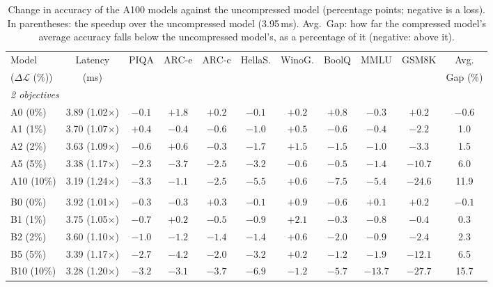 \documentclass[11pt]{article}
\newcommand{\dloss}{\Delta\mathcal{L}}
\begin{document}
\begin{table}[!ht]
\centering
\small
\setlength{\tabcolsep}{3pt}
\begin{tabular}{lcccccccccc}
\toprule
Model & Latency & PIQA & ARC-e & ARC-c & HellaS. & WinoG. & BoolQ & MMLU & GSM8K & Avg. \\
($\dloss$ (\%)) & (ms)   &      &       &       &         &        &       &      &       & Gap (\%) \\
\midrule
\multicolumn{11}{l}{\emph{2 objectives}} \\
A0  (0\%)  & 3.89 (1.02$\times$) & $-0.1$ & $+1.8$ & $+0.2$ & $-0.1$ & $+0.2$ & $+0.8$ & $-0.3$ & $+0.2$  & $-0.6$ \\
A1  (1\%)  & 3.70 (1.07$\times$) & $+0.4$ & $-0.4$ & $-0.6$ & $-1.0$ & $+0.5$ & $-0.6$ & $-0.4$ & $-2.2$  & 1.0 \\
A2  (2\%)  & 3.63 (1.09$\times$) & $-0.6$ & $+0.6$ & $-0.3$ & $-1.7$ & $+1.5$ & $-1.5$ & $-1.0$ & $-3.3$  & 1.5 \\
A5  (5\%)  & 3.38 (1.17$\times$) & $-2.3$ & $-3.7$ & $-2.5$ & $-3.2$ & $-0.6$ & $-0.5$ & $-1.4$ & $-10.7$ & 6.0 \\
A10 (10\%) & 3.19 (1.24$\times$) & $-3.3$ & $-1.1$ & $-2.5$ & $-5.5$ & $+0.6$ & $-7.5$ & $-5.4$ & $-24.6$ & 11.9 \\
\addlinespace
\multicolumn{11}{l}{\emph{3 objectives}} \\
B0  (0\%)  & 3.92 (1.01$\times$) & $-0.3$ & $-0.3$ & $+0.3$ & $-0.1$ & $+0.9$ & $-0.6$ & $+0.1$ & $+0.2$  & $-0.1$ \\
B1  (1\%)  & 3.75 (1.05$\times$) & $-0.7$ & $+0.2$ & $-0.5$ & $-0.9$ & $+2.1$ & $-0.3$ & $-0.8$ & $-0.4$  & 0.3 \\
B2  (2\%)  & 3.60 (1.10$\times$) & $-1.0$ & $-1.2$ & $-1.4$ & $-1.4$ & $+0.6$ & $-2.0$ & $-0.9$ & $-2.4$  & 2.3 \\
B5  (5\%)  & 3.39 (1.17$\times$) & $-2.7$ & $-4.2$ & $-2.0$ & $-3.2$ & $+0.2$ & $-1.2$ & $-1.9$ & $-12.1$ & 6.5 \\
B10 (10\%) & 3.28 (1.20$\times$) & $-3.2$ & $-3.1$ & $-3.7$ & $-6.9$ & $-1.2$ & $-5.7$ & $-13.7$ & $-27.7$ & 15.7 \\
\bottomrule
\end{tabular}
\caption{Change in accuracy of the A100 models against the uncompressed model (percentage points;
negative is a loss). In parentheses: the speedup over the uncompressed model (3.95\,ms). Avg.\ Gap: how far the compressed model's average accuracy falls below the uncompressed model's, as a percentage of it (negative: above it).}
\label{tab:a100delta}
\end{table}
\end{document}
